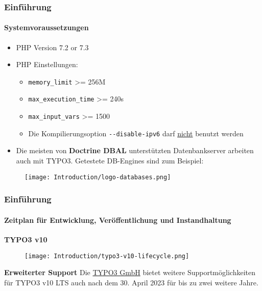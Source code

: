 
\begin{frame}[fragile]
	\frametitle{Einführung}
	\framesubtitle{Systemvoraussetzungen}

	\begin{itemize}
		\item PHP Version 7.2 or 7.3
		\item PHP Einstellungen:

			\begin{itemize}
				\item \texttt{memory\_limit} >= 256M
				\item \texttt{max\_execution\_time} >= 240s
				\item \texttt{max\_input\_vars} >= 1500
				\item Die Kompilierungsoption \texttt{-}\texttt{-disable-ipv6} darf \underline{nicht} benutzt werden
			\end{itemize}

		\item Die meisten von \textbf{Doctrine DBAL} unterstützten Datenbankserver arbeiten auch mit TYPO3.
			Getestete DB-Engines sind zum Beispiel:
	\end{itemize}

	\begin{figure}
		\texttt{[image: Introduction/logo-databases.png]}
	\end{figure}

\end{frame}


\begin{frame}[fragile]
	\frametitle{Einführung}
	\framesubtitle{Zeitplan für Entwicklung, Veröffentlichung und Instandhaltung}

	\textbf{TYPO3 v10}

	\begin{figure}
		\texttt{[image: Introduction/typo3-v10-lifecycle.png]}
	\end{figure}

	\textbf{Erweiterter Support}\newline
	\smaller
		Die \href{https://typo3.com}{TYPO3 GmbH} bietet weitere Supportmöglichkeiten
		für TYPO3 v10 LTS auch nach dem 30. April 2023 für bis zu zwei weitere 
		Jahre.
	\normalsize

\end{frame}

